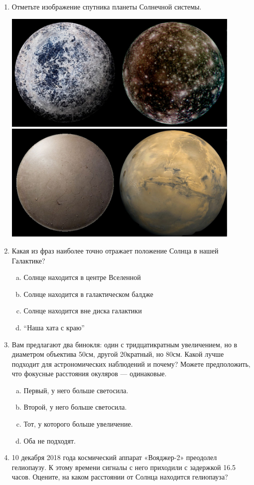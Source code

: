 \documentclass{trnotes}
\begin{document}
\begin{enumerate}
  \item Отметьте изображение спутника планеты Солнечной системы.

    \includegraphics[width=0.9\textwidth]{im1.png}\\
    \includegraphics[width=0.9\textwidth]{im2.png}
  \item Какая из фраз наиболее точно отражает положение Солнца в нашей Галактике?
    \begin{enumerate}[a)]
      \itemsep=0pt \parsep=0pt
      \item Солнце находится в центре Вселенной
      \item Солнце находится в галактическом балдже 
      \item Солнце находится вне диска галактики
      \item ``Наша хата с краю''
    \end{enumerate}
  \item Вам предлагают два бинокля: один с тридцатикратным увеличением, но в диаметром объектива 50см, другой 20кратный, но 80см. Какой лучше подходит для астрономических наблюдений и почему? Можете предположить, что фокусные расстояния окуляров --- одинаковые.
    \begin{enumerate}[a)]
      \itemsep=0pt\parsep=0pt
      \item Первый, у него больше светосила.
      \item Второй, у него больше светосила.
      \item Тот, у которого больше увеличение.
      \item Оба не подходят.
    \end{enumerate}
  \item 10 декабря 2018 года космический аппарат «Вояджер-2» преодолел гелиопаузу. К этому времени сигналы с него приходили с задержкой 16.5 часов. Оцените, на каком расстоянии от Солнца находится гелиопауза?
    

\end{enumerate}
\end{document}
